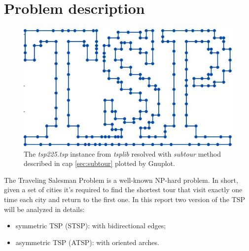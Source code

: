 \chapter{Problem description}
\begin{figure}[h]
	\centering
	\includegraphics[width=.5\columnwidth]{img/tsp225_plot}
	\caption{The \textit{tsp225.tsp} instance from \textit{tsplib} resolved with \textit{subtour} method described in cap \ref{sec:subtour} plotted by Gnuplot.}
	\label{fig:tsp225}
\end{figure}

The Traveling Salesman Problem is a well-known NP-hard problem. In short, given a set of cities it's required to find the shortest tour that visit exactly one time each city and return to the first one.
In this report two version of the TSP will be analyzed in details:
\begin{itemize}
	\item symmetric TSP (STSP): with bidirectional edges;
 	\item asymmetric TSP (ATSP): with oriented arches.
\end{itemize}


